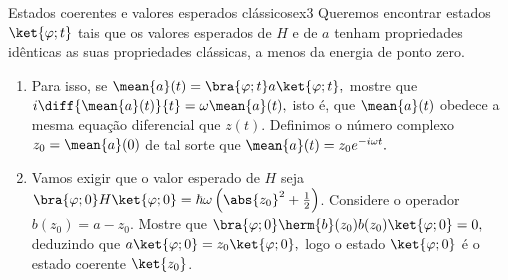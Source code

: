 \begin{exercício}{Estados coerentes e valores esperados clássicos}{ex3}
   Queremos encontrar estados \(\ket{\varphi; t}\) tais que os valores esperados de \(H\) e de \(a\) tenham propriedades idênticas as suas propriedades clássicas, a menos da energia de ponto zero. 
   \begin{enumerate}[label=(\alph*)]
      \item Para isso, se \(\mean{a}(t) = \bra{\varphi; t}a\ket{\varphi; t},\) mostre que \(i \diff{\mean{a}(t)}{t} = \omega \mean{a}(t),\) isto é, que \(\mean{a}(t)\) obedece a mesma equação diferencial que \(z(t).\) Definimos o número complexo \(z_0 = \mean{a}(0)\) de tal sorte que \(\mean{a}(t) = z_0 e^{-i \omega t}.\)

      \item Vamos exigir que o valor esperado de \(H\) seja \(\bra{\varphi; 0} H \ket{\varphi; 0} = \hbar \omega \left(\abs{z_0}^2 + \frac12\right)\). Considere o operador \(b(z_0) = a - z_0.\) Mostre que \(\bra{\varphi; 0} \herm{b}(z_0) b(z_0) \ket{\varphi; 0} = 0,\) deduzindo que \(a \ket{\varphi; 0} = z_0 \ket{\varphi; 0},\) logo o estado \(\ket{\varphi; 0}\) é o estado coerente \(\ket{z_0}\).
   \end{enumerate}
\end{exercício}

